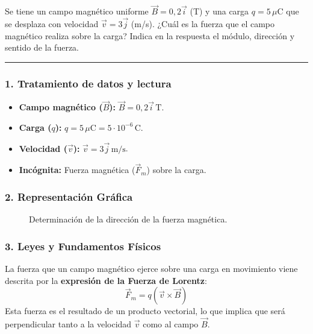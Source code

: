\begin{cajaenunciado}
Se tiene un campo magnético uniforme $\vec{B}=0,2\vec{i}$ (T) y una carga $q=5\,\mu\text{C}$ que se desplaza con velocidad $\vec{v}=3\vec{j}$ (m/s). ¿Cuál es la fuerza que el campo magnético realiza sobre la carga? Indica en la respuesta el módulo, dirección y sentido de la fuerza.
\end{cajaenunciado}
\hrule

\subsubsection*{1. Tratamiento de datos y lectura}
\begin{itemize}
    \item \textbf{Campo magnético ($\vec{B}$):} $\vec{B} = 0,2 \vec{i} \, \text{T}$.
    \item \textbf{Carga ($q$):} $q = 5 \, \mu\text{C} = 5 \cdot 10^{-6} \, \text{C}$.
    \item \textbf{Velocidad ($\vec{v}$):} $\vec{v} = 3 \vec{j} \, \text{m/s}$.
    \item \textbf{Incógnita:} Fuerza magnética ($\vec{F}_m$) sobre la carga.
\end{itemize}

\subsubsection*{2. Representación Gráfica}
\begin{figure}[H]
    \centering
    \caption{Determinación de la dirección de la fuerza magnética.}
\end{figure}

\subsubsection*{3. Leyes y Fundamentos Físicos}
La fuerza que un campo magnético ejerce sobre una carga en movimiento viene descrita por la \textbf{expresión de la Fuerza de Lorentz}:
$$ \vec{F}_m = q (\vec{v} \times \vec{B}) $$
Esta fuerza es el resultado de un producto vectorial, lo que implica que será perpendicular tanto a la velocidad $\vec{v}$ como al campo $\vec{B}$.

